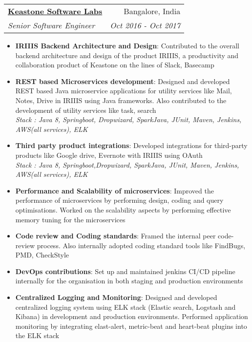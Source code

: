\documentclass[letterpaper,11pt]{article}
\makeatletter
\newcommand{\resumeItem}[2]{
  \item\small{
    \textbf{#1}{: #2 \vspace{-2pt}}
  }
}
\newcommand{\resumeSubheading}[4]{
  \vspace{-1pt}\item
    \begin{tabular*}{0.97\textwidth}{l@{\extracolsep{\fill}}r}
      \textbf{#1} & #2 \\
      \textit{\small#3} & \textit{\small #4} \\
    \end{tabular*}\vspace{-5pt}
}
\newcommand{\resumeItemListStart}{\begin{itemize}}
\newcommand{\resumeItemListEnd}{\end{itemize}\vspace{-5pt}}
\makeatother
\begin{document}
    \resumeSubheading
      {\href{http://www.keastone.com/}{Keastone Software Labs}}{Bangalore, India}
      {Senior Software Engineer}{Oct 2016 - Oct 2017}
      \resumeItemListStart
          \resumeItem{IRIIIS Backend Architecture and Design}
          {Contributed to the overall backend architecture and design of the product IRIIIS, a productivity and collaboration product of Keastone on the lines of Slack, Basecamp }
          \resumeItem{REST based Microservices development}
          {Designed and developed REST based Java microservice applications for utility services like Mail, Notes, Drive in IRIIIS using Java frameworks. Also contributed to the development of utility services like task, search\mbox{}\\
          \textit{Stack : Java 8, Springboot, Dropwizard, SparkJava, JUnit, Maven, Jenkins, AWS(all services), ELK}}
          \resumeItem{Third party product integrations}
          {Developed integrations for third-party products like Google drive, Evernote with IRIIIS using OAuth\mbox{}\\
          \textit{Stack : Java 8, Springboot,Dropwizard, SparkJava, JUnit, Maven, Jenkins, AWS(all services), ELK}}
          \resumeItem{Performance and Scalability of microservices}
          {Improved the performance of microservices by performing design, coding and query optimisations. Worked on the scalability aspects by performing effective memory tuning for the microservices}
          \resumeItem{Code review and Coding standards}
          {Framed the internal peer code-review process. Also internally adopted coding standard tools like FindBugs, PMD, CheckStyle}
          \resumeItem{DevOps contributions}
          {Set up and maintained jenkins CI/CD pipeline internally for the organisation in both staging and production environments}
           \resumeItem{Centralized Logging and Monitoring}
          {Designed and developed centralized logging system using ELK stack (Elastic search, Logstash and Kibana) in development and production environments. Performed application monitoring by integrating elast-alert, metric-beat and heart-beat plugins into the ELK stack}
      \resumeItemListEnd
\end{document}
